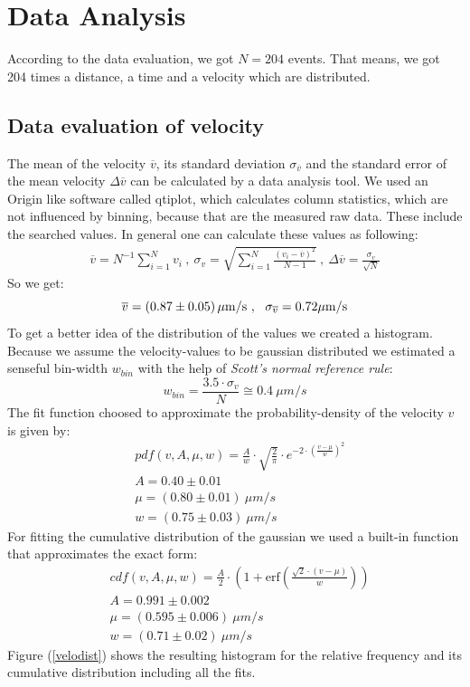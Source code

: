 \section{Data Analysis}

    According to the data evaluation, we got $N = 204$ events. That means, we got 204 times a distance, a time and a velocity which are distributed. 
    \subsection{Data evaluation of velocity}
        The mean of the velocity $\overline v$, its standard deviation $\sigma_{\overline v}$ and the standard error of the mean velocity $\Delta \overline v$ can be calculated by a data analysis tool. We used an Origin like software called qtiplot, which calculates column statistics, which are not influenced by binning, because that are the measured raw data. These include the searched values.
        In general one can calculate these values as following:
        \begin{eqnarray*}
            \overline v = N^{-1} \sum_{i = 1}^{N}v_i\ ,\ \sigma_{v} = \sqrt{\sum_{i = 1}^{N} \frac{(v_i - \overline v)^2}{N-1}}\ , \ \Delta \overline v = \frac{\sigma_{v}}{\sqrt{N}}
        \end{eqnarray*}
        So we get:
        $$ \overline v = \unit[(0.87 \pm 0.05)]{\mu m/s}\ , \ \ \sigma_{\overline v} = 0.72 \unit{\mu m/s}$$
        To get a better idea of the distribution of the values we created a histogram. Because we assume the velocity-values to be gaussian distributed we estimated a senseful bin-width $w_{bin}$ with the help of \textit{Scott's normal reference rule}\cite{wikiHisto}:
	    $$ w_{bin} = \frac{3.5 \cdot \sigma_v}{N} \cong 0.4\ \unit{\mu m/s}$$
	    The fit function choosed to approximate the probability-density of the velocity $v$ is given by:
	    \begin{align*}
	    		&pdf(v,A,\mu, w) = \frac{A}{w}\cdot \sqrt{\frac{2}{\pi}}\cdot e^{-2\cdot\left(\frac{v-\mu}{w}\right)^2}\\
	    		&A = 0.40\pm 0.01\\
	    		&\mu = (0.80 \pm 0.01)\ \unit{\mu m/s}\\
	    		&w = (0.75 \pm 0.03)\ \unit{\mu m/s}
	    \end{align*}
	    For fitting the cumulative distribution of the gaussian we used a built-in function that approximates the exact form:
	    \begin{align*}
		    &cdf(v,A,\mu,w) =\frac{A}{2}\cdot\left(1+\mathrm{erf}\left(\frac{\sqrt{2}\cdot(v-\mu)}{w}\right)\right)\\
		    &A = 0.991 \pm 0.002\\
		    &\mu = (0.595 \pm 0.006)\ \unit{\mu m/s}\\
		    &w = (0.71 \pm 0.02)\ \unit{\mu m/s}
	    \end{align*} 
	    Figure (\ref{velodist}) shows the resulting histogram for the relative frequency and its cumulative distribution including all the fits.
        
